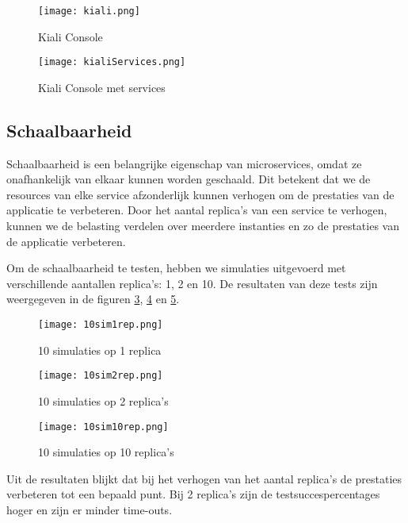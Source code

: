 \begin{figure}[H]
    \centering	
    \texttt{[image: kiali.png]} 
    \caption{Kiali Console} 
    \label{fig:kaili}
\end{figure}

\begin{figure}[H]
    \centering	
    \texttt{[image: kialiServices.png]} 
    \caption{Kiali Console met services} 
    \label{fig:kialiServices}
\end{figure}


\subsection{Schaalbaarheid}

Schaalbaarheid is een belangrijke eigenschap van microservices, omdat ze onafhankelijk van elkaar kunnen worden geschaald. Dit betekent dat we de resources van elke service afzonderlijk kunnen verhogen om de prestaties van de applicatie te verbeteren. Door het aantal replica's van een service te verhogen, kunnen we de belasting verdelen over meerdere instanties en zo de prestaties van de applicatie verbeteren.

Om de schaalbaarheid te testen, hebben we simulaties uitgevoerd met verschillende aantallen replica's: 1, 2 en 10. De resultaten van deze tests zijn weergegeven in de figuren \ref{fig:1replica}, \ref{fig:2replica}   en \ref{fig:10replica}.

\begin{figure}[H]
    \centering	
    \texttt{[image: 10sim1rep.png]}
    \caption{10 simulaties op 1 replica} 
    \label{fig:1replica}
\end{figure}

\begin{figure}[H]
    \centering	
    \texttt{[image: 10sim2rep.png]}
    \caption{10 simulaties op 2 replica's} 
    \label{fig:2replica}
\end{figure}

\begin{figure}[H]
    \centering	
    \texttt{[image: 10sim10rep.png]}
    \caption{10 simulaties op 10 replica's} 
    \label{fig:10replica}
\end{figure}

Uit de resultaten blijkt dat bij het verhogen van het aantal replica's de prestaties verbeteren tot een bepaald punt. Bij 2 replica's zijn de testsuccespercentages hoger en zijn er minder time-outs. 

